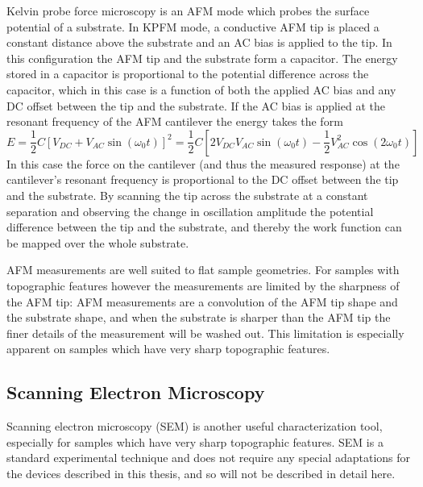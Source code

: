 \documentclass[edeposit,fullpage,draftthesis]{uiucthesis2009}
\begin{document}
        
        Kelvin probe force microscopy is an AFM mode which probes the surface potential of a substrate.
        In KPFM mode, a conductive AFM tip is placed a constant distance above the substrate
        and an AC bias is applied to the tip. In this configuration the AFM tip and the substrate form a capacitor.
        The energy stored in a capacitor is proportional to the potential difference across the capacitor, 
        which in this case is a function of both the applied AC bias and any DC offset between the tip and the substrate.
        If the AC bias is applied at the resonant frequency of the AFM cantilever the energy takes the form
        \begin{equation}
        E = \frac{1}{2}C[V_{DC} + V_{AC}\sin(\omega_0 t)]^2 = \frac{1}{2}C[2V_{DC}V_{AC}\sin(\omega_0 t) - \frac{1}{2}V_{AC}^2 \cos(2\omega_0 t)]
        \end{equation}
        In this case the force on the cantilever (and thus the measured response) at the cantilever's resonant 
        frequency is proportional to the DC offset between the tip and the substrate. By scanning the tip across
        the substrate at a constant separation and observing the change in oscillation amplitude 
        the potential difference between the tip and the substrate, and thereby
        the work function can be mapped over the whole substrate.
        
        AFM measurements are well suited to flat sample geometries. For samples with topographic features
        however the measurements are limited by the sharpness of the AFM tip: AFM measurements are a convolution
        of the AFM tip shape and the substrate shape, and when the substrate is sharper than the AFM tip the finer details
        of the measurement will be washed out.
        This limitation is especially apparent on samples which have very sharp topographic features.
        
        \subsection{Scanning Electron Microscopy}
        
        Scanning electron microscopy (SEM) is another useful characterization tool, especially for samples
        which have very sharp topographic features. SEM is a standard experimental technique and does
        not require any special adaptations for the devices described in this thesis, and so will
        not be described in detail here.
        
\end{document}

